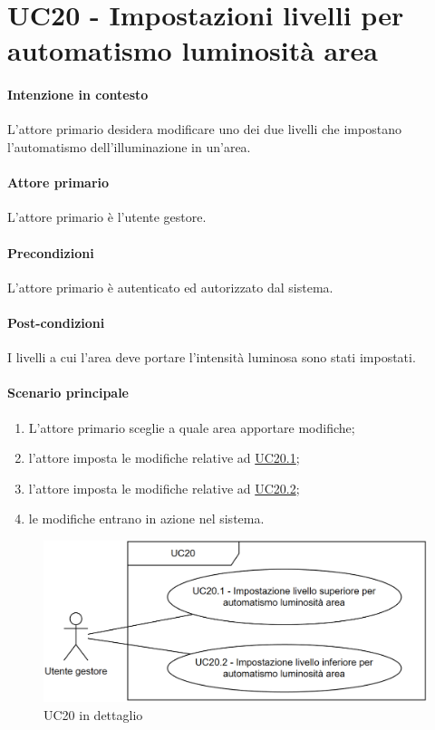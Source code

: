 \section{UC20 - Impostazioni livelli per automatismo luminosità area}\label{uc:20}
\paragraph{Intenzione in contesto} L'attore primario desidera modificare uno dei due livelli che impostano l'automatismo dell'illuminazione in un'area. 

\paragraph{Attore primario} L'attore primario è l'utente gestore.
\paragraph{Precondizioni} L'attore primario è autenticato ed autorizzato dal sistema.
\paragraph{Post-condizioni} I livelli a cui l'area deve portare l'intensità luminosa sono stati impostati.
\paragraph{Scenario principale}
\begin{enumerate}
    \item L'attore primario sceglie a quale area apportare modifiche;
    \item l'attore imposta le modifiche relative ad \hyperref[uc:20.1]{UC20.1};
    \item l'attore imposta le modifiche relative ad \hyperref[uc:20.2]{UC20.2};
    \item le modifiche entrano in azione nel sistema. 
\end{enumerate}

\begin{figure}[H]
    \includegraphics[width=\textwidth]{contenuti/img/casi_uso_grafici-uc20.png}
    \caption{UC20 in dettaglio}
    \label{fig:uc20}
\end{figure}

